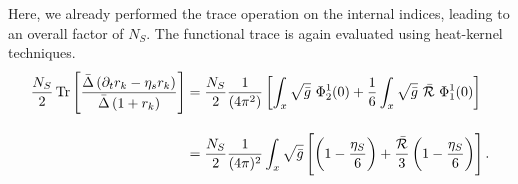 Here, we already performed the trace operation on the internal indices, leading to an overall factor of $N_S$. The functional trace is again evaluated using heat-kernel techniques.
\begin{equation}
\begin{aligned}
	\frac{N_S}{2}\operatorname{Tr}\left[ \frac{\bar{\Delta}\left(\partial_t r_k - \eta_s r_k\right)}{\bar{\Delta}\left(1 + r_k\right)} \right] &= \frac{N_S}{2}\frac{1}{(4\pi^2)}\left[\int_x\sqrt{\bar{g}} \  \Phi_2^1(0) + \frac{1}{6}\int_x\sqrt{\bar{g}} \ \bar{\mathcal{R}}\ \Phi_1^1(0) \right]\\[10pt]
	&= 	\frac{N_S}{2}\frac{1}{(4\pi)^2}\int_x\sqrt{\bar{g}}\left[\left(1-\frac{\eta_S}{6}\right) + \frac{\bar{\mathcal{R}}}{3}\left(1-\frac{\eta_S}{6}\right)\right].
\end{aligned}
\end{equation}
